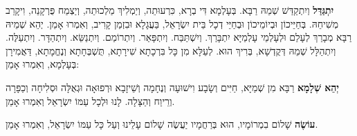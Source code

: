 
\textbf{יִתְגַּדַּל} וְיִתְקַדַּשׁ שְׁמֵהּ רַבָּא.  בְּעָלְמָא דִּי בְרָא, כִּרְעוּתֵה, וְיַמְלִיךְ מַלְכוּתֵה, וְיַצְמַח פֻּרְקָנֵה, וִיקָרֵב מְשִׁיחֵהּ.  בְּחַיֵּיכוֹן וּבְיוֹמֵיכוֹן וּבְחַיֵּי דְכָל בֵּית יִשְׂרָאֵל, בַּעֲגָלָא וּבִזְמַן קָרִיב, וְאִמְרוּ אָמֵן.  יְהֵא שְׁמֵיהּ רַבָּא מְבָרַךְ לְעָלַם וּלְעָלְמֵי עָלְמַיָּא יִתְבָּרַךְ. וְיִשְׁתַּבַּח. וְיִתְפָּאַר. וְיִתְרוֹמַם. וְיִתְנַשֵּׂא. וְיִתְהַדָּר. וְיִתְעַלֶּה. וְיִתְהַלָּל שְׁמֵהּ דְּקֻדְשָׁא, בְּרִיךְ הוּא.  לְעֵלָּא מִן כָּל בִּרְכָתָא שִׁירָתָא, תֻּשְׁבְּחָתָא וְנֶחֱמָתָא, דַּאֲמִירָן בְּעָלְמָא, וְאִמְרוּ אָמֵן: 

\textbf{יְהֵא שְׁלָמָא} רַבָּא מִן שְׁמַיָּא, חַיִּים וְשָׂבָע וִישׁוּעָה וְנֶחָמָה וְשֵׁיזָבָא וּרְפוּאָה וּגְאֻלָּה וּסְלִיחָה וְכַפָּרָה וְרֵיוַח וְהַצָּלָה. לָנוּ וּלְכָל עַמּוֹ יִשְׂרָאֵל וְאִמְרוּ אָמֵן. 

\textbf{עוֹשֶׂה} שָׁלוֹם בִמְרוֹמָיו, הוּא בְּרַחֲמָיו יַעֲשֶׂה שָׁלוֹם עָלֵינוּ וְעַל כָּל עַמּוֹ יִשְׂרָאֵל, וְאִמְרוּ אָמֵן. 
